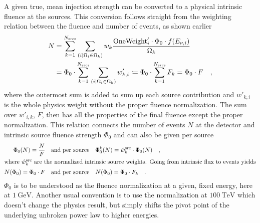 A given true, mean injection strength can be converted to a physical intrinsic fluence at the sources.
This conversion follows straight from the weighting relation between the fluence and number of events, as shown earlier
\begin{align}
  N &= \sum_{k=1}^{N_\text{srcs}} \sum_{(i|\Omega_i \in \Omega_k)}
    w_k\frac{\text{OneWeight}'_i\cdot\Phi_0\cdot f(E_{\nu,i})}{\Omega_k} \\
  &= \Phi_0 \cdot
      \sum_{k=1}^{N_\text{srcs}}
      \sum_{(i|\Omega_i \in \Omega_k)} w'_{k,i}
  \coloneqq \Phi_0 \cdot \sum_{k=1}^{N_\text{srcs}} F_k = \Phi_0 \cdot F
  \quad\text{,}
\end{align}
where the outermost sum is added to sum up each source contribution and $w'_{k,i}$ is the whole physics weight without the proper fluence normalization.
The sum over $w'_{i,k}$, $F$, then has all the properties of the final fluence except the proper normalization.
This relation connects the number of events $N$ at the detector and intrinsic source fluence strength $\Phi_0$ and can also be given per source
\begin{align}
  \Phi_0(N) = \frac{N}{F}
    &\quad\text{and per source}\quad
    \Phi_0^k(N) = \hat{w}_k^\text{src} \cdot \Phi_0(N)
    \quad\text{,} \\
  \intertext{where $\hat{w}_k^\text{src}$ are the normalized intrinsic source weights. Going from intrinsic flux to events yields}
  N(\Phi_0) = \Phi_0 \cdot F
    &\quad\text{and per source}\quad
    N(\Phi_0) = \Phi_0 \cdot F_k
  \quad\text{.}
\end{align}
$\Phi_0$ is to be understood as the fluence normalization at a given, fixed energy, here at $\SI{1}{\GeV}$.
Another usual convention is to use the normalization at $\SI{100}{\TeV}$ which doesn't change the physics result, but simply shifts the pivot point of the underlying unbroken power law to higher energies.

